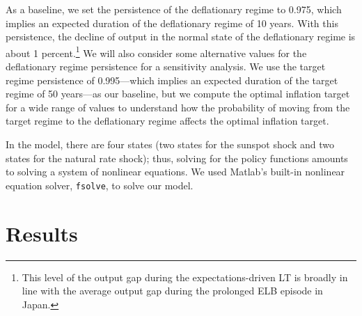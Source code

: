 \documentclass[11pt]{article}
\begin{document}
	As a baseline, we set the persistence of the deflationary regime to 0.975, which implies an expected duration of the deflationary regime of 10 years. With this persistence, the decline of output in the normal state of the deflationary regime is about 1 percent.\footnote{This level of the output gap during the expectations-driven LT is broadly in line with the average output gap during the prolonged ELB episode in Japan.} We will also consider some alternative values for the deflationary regime persistence for a sensitivity analysis. We use the target regime persistence of 0.995---which implies an expected duration of the target regime of 50 years---as our baseline, but we compute the optimal inflation target for a wide range of values to understand how the probability of moving from the target regime to the deflationary regime affects the optimal inflation target. 
	
	In the model, there are four states (two states for the sunspot shock and two states for the natural rate shock); thus, solving for the policy functions amounts to solving a system of nonlinear equations. We used Matlab's built-in nonlinear equation solver, \texttt{fsolve}, to solve our model.
	
	
	\section{Results}
	\label{S:StylizedResults}
	
\end{document}
